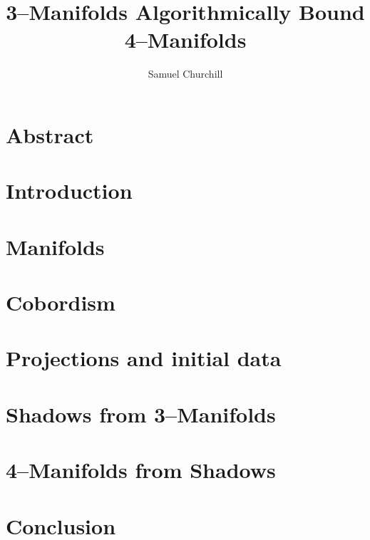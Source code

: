 \documentclass[12pt]{report}
\author{Samuel Churchill}
\title{3--Manifolds Algorithmically Bound 4--Manifolds}
\begin{document}
\maketitle

\chapter*{Abstract}

\tableofcontents

\chapter{Introduction}


\chapter{Manifolds}


\chapter{Cobordism}


\chapter{Projections and initial data}
\label{cha:projection}


\chapter{Shadows from 3--Manifolds}
\label{cha:shadow}


\chapter{4--Manifolds from Shadows}
\label{cha:manifold}


\chapter{Conclusion}



% 

{}

\end{document}
